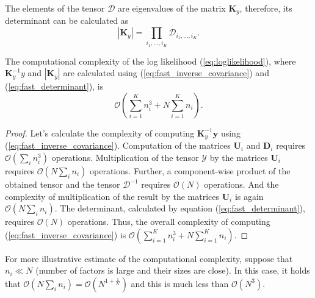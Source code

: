 The elements of the tensor $\mathcal{D}$ are eigenvalues of the matrix $\mathbf{K}_y$,
therefore, its determinant can be calculated as
\begin{equation}
  \label{eq:fast_determinant}
  |\mathbf{K}_y| = \prod_{i_1, \ldots, i_K} \mathcal{D}_{i_1, \ldots, i_K}.
\end{equation}

\begin{proposition}
  The computational complexity of the log likelihood (\ref{eq:loglikelihood}), where $\mathbf{K}_y^{-1}y$ and
  $|\mathbf{K}_y|$ are calculated using (\ref{eq:fast_inverse_covariance}) and (\ref{eq:fast_determinant}), is
  \begin{equation}
    \mathcal{O} \left (\sum_{i = 1}^K n_i^3 + N\sum_{i = 1}^K n_i \right ).
  \end{equation}
\end{proposition}
\begin{proof}
  Let's calculate the complexity of computing $\mathbf{K}_y^{-1} \mathbf{y}$ using (\ref{eq:fast_inverse_covariance}).
  Computation of the matrices $\mathbf{U}_i$ and $\mathbf{D}_i$ requires $\mathcal{O}(\sum_i n_i^3)$ operations.
  Multiplication of the tensor $\mathcal{Y}$ by the matrices $\mathbf{U}_i$ requires $\mathcal{O}(N\sum_i n_i)$ operations.
  Further, a component-wise product of the obtained tensor and the tensor $\mathcal{D}^{-1}$ requires $\mathcal{O}(N)$
  operations.
  And the complexity of multiplication of the result by the matrices $\mathbf{U}_i$ is again $\mathcal{O}(N\sum_i n_i)$.
  The determinant, calculated by equation (\ref{eq:fast_determinant}), requires $\mathcal{O}(N)$ operations.
  Thus, the overall complexity of computing (\ref{eq:fast_inverse_covariance}) is
  ${\mathcal{O}(\sum_{i = 1}^K n_i^3 + N\sum_{i = 1}^K n_i)}$.
\end{proof}

For more illustrative estimate of the computational complexity,
suppose that $n_i \ll N$ (number of factors is large and their sizes are close).
In this case, it holds that
$\mathcal{O}(N\sum_i n_i) = \mathcal{O}(N^{1 + \frac{1}{K}})$ and this is
much less than $\mathcal{O}(N^3)$.

